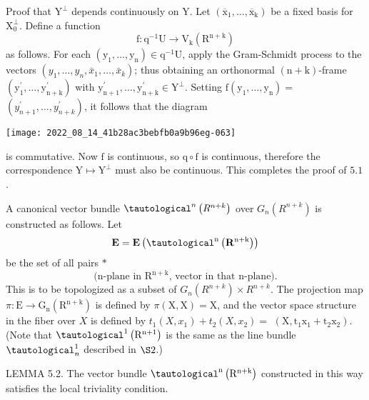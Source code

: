 \documentclass[10pt]{article}
\begin{document}
Proof that $\mathrm{Y}^{\perp}$ depends continuously on $\mathrm{Y}$. Let $\left(\overline{\mathrm{x}}_{1}, \ldots, \overline{\mathrm{x}}_{\mathrm{k}}\right)$ be a fixed basis for $\mathrm{X}_{0}^{\perp}$. Define a function
$$
\mathrm{f}: \mathrm{q}^{-1} \mathrm{U} \rightarrow \mathrm{V}_{\mathrm{k}}\left(\mathrm{R}^{\mathrm{n}+\mathrm{k}}\right)
$$
as follows. For each $\left(\mathrm{y}_{1}, \ldots, \mathrm{y}_{\mathrm{n}}\right) \in \mathrm{q}^{-1} \mathrm{U}$, apply the Gram-Schmidt process to the vectors $\left(y_{1}, \ldots, y_{n}, \bar{x}_{1}, \ldots, \bar{x}_{k}\right)$; thus obtaining an orthonormal $(\mathrm{n}+\mathrm{k})$-frame $\left(\mathrm{y}_{1}^{\prime}, \ldots, \mathrm{y}_{\mathrm{n}+\mathrm{k}}^{\prime}\right)$ with $\mathrm{y}_{\mathrm{n}+1}^{\prime}, \ldots, \mathrm{y}_{\mathrm{n}+\mathrm{k}}^{\prime} \in \mathrm{Y}^{\perp} .$ Setting $\mathrm{f}\left(\mathrm{y}_{1}, \ldots, \mathrm{y}_{\mathrm{n}}\right)=$ $\left(y_{n+1}^{\prime}, \ldots, y_{n+k}^{\prime}\right)$, it follows that the diagram

\texttt{[image: 2022\_08\_14\_41b28ac3bebfb0a9b96eg-063]}

is commutative. Now $\mathrm{f}$ is continuous, so $\mathrm{q} \circ \mathrm{f}$ is continuous, therefore the correspondence $\mathrm{Y} \mapsto \mathrm{Y}^{\perp}$ must also be continuous. This completes the proof of $5.1$.

A canonical vector bundle $\tautological^{n}\left(R^{n+k}\right)$ over $G_{n}\left(R^{n+k}\right)$ is constructed as follows. Let
$$
\mathbf{E}=\mathbf{E}\left(\tautological^{\mathrm{n}}\left(\mathbf{R}^{\mathrm{n}+\mathrm{k}}\right)\right)
$$
be the set of all pairs $*$
$$
\text { (n-plane in } \mathrm{R}^{\mathrm{n}+\mathrm{k}} \text {, vector in that } \mathrm{n} \text {-plane). }
$$
This is to be topologized as a subset of $G_{n}\left(R^{n+k}\right) \times R^{n+k}$. The projection map $\pi: \mathrm{E} \rightarrow \mathrm{G}_{\mathrm{n}}\left(\mathrm{R}^{\mathrm{n}+\mathrm{k}}\right)$ is defined by $\pi(\mathrm{X}, \mathrm{X})=\mathrm{X}$, and the vector space structure in the fiber over $X$ is defined by $t_{1}\left(X, x_{1}\right)+t_{2}\left(X, x_{2}\right)=$ $\left(\mathrm{X}, \mathrm{t}_{1} \mathrm{x}_{1}+\mathrm{t}_{2} \mathrm{x}_{2}\right)$. (Note that $\tautological^{1}\left(\mathrm{R}^{\mathrm{n}+1}\right)$ is the same as the line bundle $\tautological_{n}^{1}$ described in $\S 2$.)

LEMMA 5.2. The vector bundle $\tautological^{\mathrm{n}}\left(\mathrm{R}^{\mathrm{n}+\mathrm{k}}\right)$ constructed in this way satisfies the local triviality condition.
\end{document}
